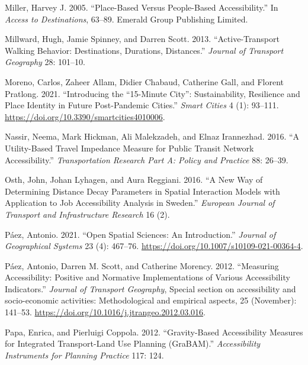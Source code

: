 \documentclass[preprint, 3p,
authoryear]{elsarticle} %
\newlength{\cslhangindent}
\newlength{\cslentryspacingunit} %
\newenvironment{CSLReferences}[2] %
 {%
  \setlength{\parindent}{0pt}
  \ifodd #1
  \let\oldpar\par
  \def\par{\hangindent=\cslhangindent\oldpar}
  \fi
  \setlength{\parskip}{#2\cslentryspacingunit}
 }%
 {}
\begin{document}
\begin{CSLReferences}{1}{0}
\leavevmode{}%
Miller, Harvey J. 2005. {``Place-Based Versus People-Based
Accessibility.''} In \emph{Access to Destinations}, 63--89. Emerald
Group Publishing Limited.

\leavevmode{}%
Millward, Hugh, Jamie Spinney, and Darren Scott. 2013.
{``Active-Transport Walking Behavior: Destinations, Durations,
Distances.''} \emph{Journal of Transport Geography} 28: 101--10.

\leavevmode{}%
Moreno, Carlos, Zaheer Allam, Didier Chabaud, Catherine Gall, and
Florent Pratlong. 2021. {``Introducing the {``}15-Minute City{''}:
Sustainability, Resilience and Place Identity in Future Post-Pandemic
Cities.''} \emph{Smart Cities} 4 (1): 93--111.
\url{https://doi.org/10.3390/smartcities4010006}.

\leavevmode{}%
Nassir, Neema, Mark Hickman, Ali Malekzadeh, and Elnaz Irannezhad. 2016.
{``A Utility-Based Travel Impedance Measure for Public Transit Network
Accessibility.''} \emph{Transportation Research Part A: Policy and
Practice} 88: 26--39.

\leavevmode{}%
Osth, John, Johan Lyhagen, and Aura Reggiani. 2016. {``A New Way of
Determining Distance Decay Parameters in Spatial Interaction Models with
Application to Job Accessibility Analysis in Sweden.''} \emph{European
Journal of Transport and Infrastructure Research} 16 (2).

\leavevmode{}%
Páez, Antonio. 2021. {``Open Spatial Sciences: An Introduction.''}
\emph{Journal of Geographical Systems} 23 (4): 467--76.
\url{https://doi.org/10.1007/s10109-021-00364-4}.

\leavevmode{}%
Páez, Antonio, Darren M. Scott, and Catherine Morency. 2012.
{``Measuring Accessibility: Positive and Normative Implementations of
Various Accessibility Indicators.''} \emph{Journal of Transport
Geography}, Special section on accessibility and socio-economic
activities: Methodological and empirical aspects, 25 (November):
141--53. \url{https://doi.org/10.1016/j.jtrangeo.2012.03.016}.

\leavevmode{}%
Papa, Enrica, and Pierluigi Coppola. 2012. {``Gravity-Based
Accessibility Measures for Integrated Transport-Land Use Planning
(GraBAM).''} \emph{Accessibility Instruments for Planning Practice} 117:
124.


\end{CSLReferences}
\end{document}
